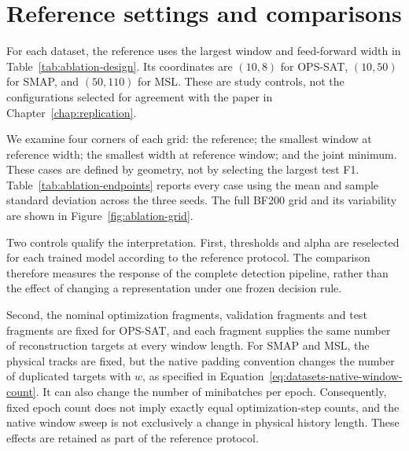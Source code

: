 \section{Reference settings and comparisons}
\label{sec:ablation-controls}
For each dataset, the reference uses the largest window and feed-forward
width in Table~\ref{tab:ablation-design}. Its coordinates are
\((\num{10},\num{8})\) for \ac{OPS-SAT},
\((\num{10},\num{50})\) for \ac{SMAP}, and
\((\num{50},\num{110})\) for \ac{MSL}.
These are study controls, not the configurations selected for agreement
with the paper in Chapter~\ref{chap:replication}.

We examine four corners of each grid: the reference; the smallest window
at reference width; the smallest width at reference window; and the joint
minimum. These cases are defined by geometry, not by selecting the largest
test F1. Table~\ref{tab:ablation-endpoints} reports every case using the
mean and sample standard deviation across the three seeds. The full
BF200 grid and its variability are shown in
Figure~\ref{fig:ablation-grid}.

\begin{table}[htbp]
  \centering
  \small
  \setlength{\tabcolsep}{7pt}
  
  \caption{Detection at the four grid corners. F1 is reported as
  mean \(\pm\) sample standard deviation, in percent, across \num{3} seeds.
  All entries use point adjustment and all endpoint runs belong to the
  first campaign. These are fixed-setting summaries, not best-seed values.}
  \label{tab:ablation-endpoints}
\end{table}

Two controls qualify the interpretation. First, thresholds and alpha are
reselected for each trained model according to the reference protocol.
The comparison therefore measures the response of the complete detection
pipeline, rather than the effect of changing a representation under one
frozen decision rule.

Second, the nominal optimization fragments, validation fragments and test
fragments are fixed for \ac{OPS-SAT}, and each fragment supplies the same
number of reconstruction targets at every window length. For
\ac{SMAP} and \ac{MSL}, the physical tracks are fixed, but the native
padding convention changes the number of duplicated targets with \(w\),
as specified in Equation~\eqref{eq:datasets-native-window-count}.
It can also change the number of minibatches per epoch. Consequently,
fixed epoch count does not imply exactly equal optimization-step counts,
and the native window sweep is not exclusively a change in physical
history length. These effects are retained as part of the reference
protocol.

